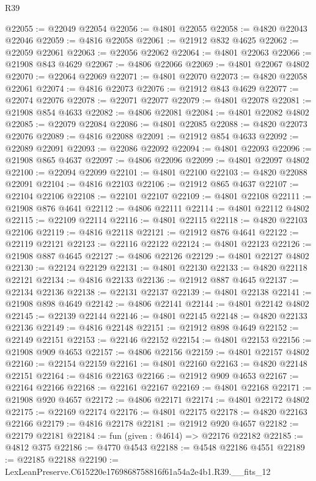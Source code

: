 \begin{lexlean}{R39}
\begin{coremodule}
@22055 := @22049 @22054
@22056 := @4801 @22055
@22058 := @4820 @22043 @22046
@22059 := @4816 @22058
@22061 := @21912 @832 @4625
@22062 := @22059 @22061
@22063 := @22056 @22062
@22064 := @4801 @22063
@22066 := @21908 @843 @4629
@22067 := @4806 @22066
@22069 := @4801 @22067 @4802
@22070 := @22064 @22069
@22071 := @4801 @22070
@22073 := @4820 @22058 @22061
@22074 := @4816 @22073
@22076 := @21912 @843 @4629
@22077 := @22074 @22076
@22078 := @22071 @22077
@22079 := @4801 @22078
@22081 := @21908 @854 @4633
@22082 := @4806 @22081
@22084 := @4801 @22082 @4802
@22085 := @22079 @22084
@22086 := @4801 @22085
@22088 := @4820 @22073 @22076
@22089 := @4816 @22088
@22091 := @21912 @854 @4633
@22092 := @22089 @22091
@22093 := @22086 @22092
@22094 := @4801 @22093
@22096 := @21908 @865 @4637
@22097 := @4806 @22096
@22099 := @4801 @22097 @4802
@22100 := @22094 @22099
@22101 := @4801 @22100
@22103 := @4820 @22088 @22091
@22104 := @4816 @22103
@22106 := @21912 @865 @4637
@22107 := @22104 @22106
@22108 := @22101 @22107
@22109 := @4801 @22108
@22111 := @21908 @876 @4641
@22112 := @4806 @22111
@22114 := @4801 @22112 @4802
@22115 := @22109 @22114
@22116 := @4801 @22115
@22118 := @4820 @22103 @22106
@22119 := @4816 @22118
@22121 := @21912 @876 @4641
@22122 := @22119 @22121
@22123 := @22116 @22122
@22124 := @4801 @22123
@22126 := @21908 @887 @4645
@22127 := @4806 @22126
@22129 := @4801 @22127 @4802
@22130 := @22124 @22129
@22131 := @4801 @22130
@22133 := @4820 @22118 @22121
@22134 := @4816 @22133
@22136 := @21912 @887 @4645
@22137 := @22134 @22136
@22138 := @22131 @22137
@22139 := @4801 @22138
@22141 := @21908 @898 @4649
@22142 := @4806 @22141
@22144 := @4801 @22142 @4802
@22145 := @22139 @22144
@22146 := @4801 @22145
@22148 := @4820 @22133 @22136
@22149 := @4816 @22148
@22151 := @21912 @898 @4649
@22152 := @22149 @22151
@22153 := @22146 @22152
@22154 := @4801 @22153
@22156 := @21908 @909 @4653
@22157 := @4806 @22156
@22159 := @4801 @22157 @4802
@22160 := @22154 @22159
@22161 := @4801 @22160
@22163 := @4820 @22148 @22151
@22164 := @4816 @22163
@22166 := @21912 @909 @4653
@22167 := @22164 @22166
@22168 := @22161 @22167
@22169 := @4801 @22168
@22171 := @21908 @920 @4657
@22172 := @4806 @22171
@22174 := @4801 @22172 @4802
@22175 := @22169 @22174
@22176 := @4801 @22175
@22178 := @4820 @22163 @22166
@22179 := @4816 @22178
@22181 := @21912 @920 @4657
@22182 := @22179 @22181
@22184 := fun (given : @4614) => @22176 @22182
@22185 := @4812 @375
@22186 := @4770 @4543
@22188 := @4548 @22186 @4551
@22189 := @22185 @22188
@22190 := LexLeanPreserve.C615220e1769868758816f61a54a2e4b1.R39.__fits_12

\end{coremodule}
\end{lexlean}

